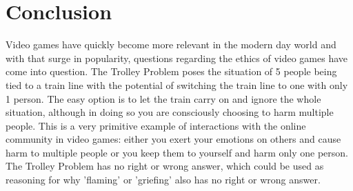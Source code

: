 \documentclass[12pt]{article}
\begin{document}
\section{Conclusion}
Video games have quickly become more relevant in the modern day world and with that surge in popularity, questions regarding the ethics of video games have come into question. The Trolley Problem \cite{7344559} poses the situation of 5 people being tied to a train line with the potential of switching the train line to one with only 1 person.
The easy option is to let the train carry on and ignore the whole situation, although in doing so you are consciously choosing to harm multiple people. This is a very primitive example of interactions with the online community in video games: either you exert your emotions on others and cause harm to multiple people or you keep them to yourself and harm only one person. 
The Trolley Problem has no right or wrong answer, which could be used as reasoning for why 'flaming' or 'griefing' also has no right or wrong answer. 




\end{document}
